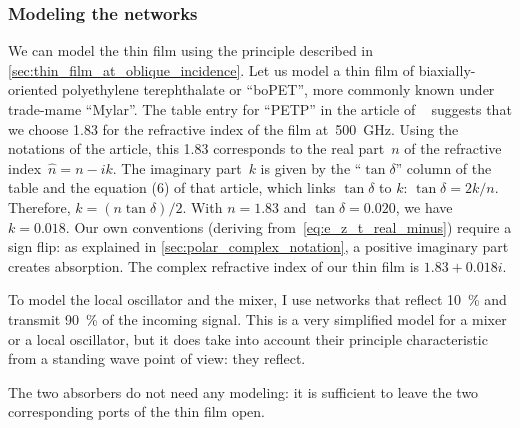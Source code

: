 
\subsubsection{Modeling the networks}

We can model the thin film using the principle described in \cref{sec:thin_film_at_oblique_incidence}.
Let us model a thin film of biaxially-oriented polyethylene terephthalate or ``boPET'', more commonly known under trade-mame ``Mylar''.
The table entry for ``PETP'' in the article of \citeauthor{lamb1996miscellaneous}~\cite{lamb1996miscellaneous} suggests that we choose 1.83 for the refractive index of the film at~\SI{500}{\giga\hertz}.
Using the notations of the article,
this 1.83 corresponds to the real part~$n$ of the refractive index~$\hat{n}=n-ik$.
The imaginary part~$k$ is given by the ``$\tan \delta$'' column of the table and
the equation (6) of that article, which links $\tan \delta$ to $k$: $\tan \delta = 2k/n$.
Therefore, $k = (n \tan \delta) / 2$.
With $n=1.83$ and $\tan \delta = 0.020$, we have $k=0.018$.
Our own conventions (deriving from~\cref{eq:e_z_t_real_minus}) require a sign flip: as explained in \vref{sec:polar_complex_notation}, a positive imaginary part creates absorption.
The complex refractive index of our thin film is $1.83+0.018i$.


To model the local oscillator and the mixer, I use networks that reflect \SI{10}{\percent} and transmit \SI{90}{\percent} of the incoming signal.
This is a very simplified model for a mixer or a local oscillator, but it does take into account their principle characteristic from a standing wave point of view: they reflect.

The two absorbers do not need any modeling: it is sufficient to leave the two corresponding ports of the thin film open.


